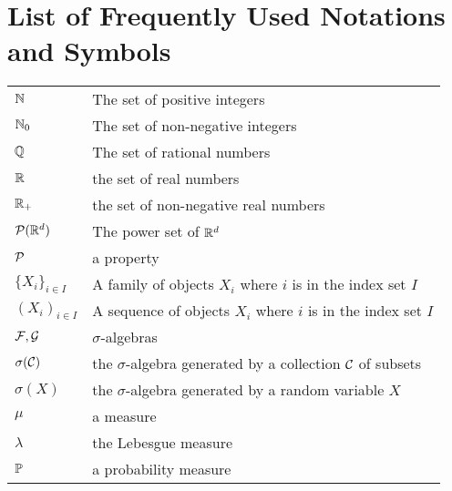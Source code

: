 \chapter*{List of Frequently Used Notations and Symbols}
\renewcommand{\arraystretch}{1.2}
\begin{tabular}{ll}
  $\NN$              & The set of positive integers                                                        \\
  $\NN_0$            & The set of non-negative integers                                                    \\
  $\QQ$              & The set of rational numbers                                                         \\
  $\RR$              & the set of real numbers                                                             \\
  $\RR_+$            & the set of non-negative real numbers                                                \\
  $\P(\RR^d)$        & The power set of $\RR^d$                                                            \\
  $\P $              & a property                                                                          \\
  $\{X_i\}_{i\in I}$ & A family of objects $X_i$ where $i$ is in the index set $I$                         \\
  $(X_i)_{i\in I}$   & A sequence of objects $X_i$ where $i$ is in the index set $I$                       \\
  $\F,\G$            & $\sigma$-algebras                                                                   \\
  $\sigma(\C)$       & the $\sigma$-algebra generated by a collection $\C$ of subsets                      \\
  $\sigma(X)$        & the $\sigma$-algebra generated by a random variable $X$                             \\
  $\mu$              & a measure                                                                           \\
  $\lambda$          & the Lebesgue measure                                                                \\
  $\PP$              & a probability measure                                                               \\

\end{tabular}
